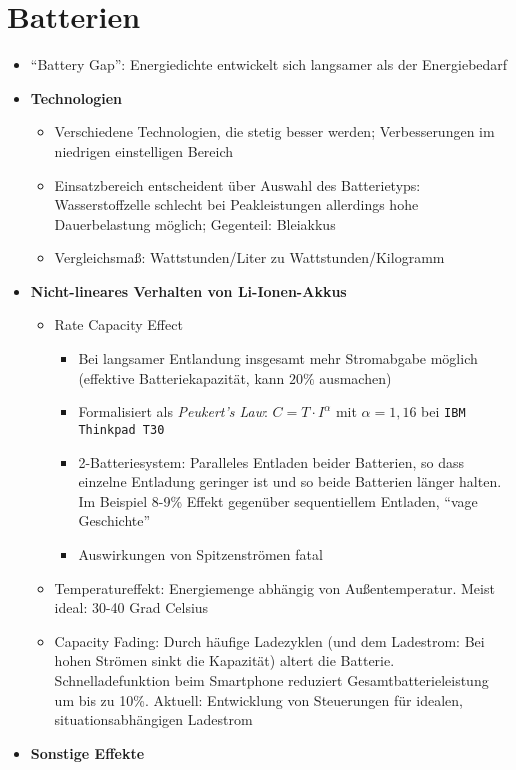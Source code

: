 \section{Batterien}
\begin{itemize}
	\item "`Battery Gap"': Energiedichte entwickelt sich langsamer als der Energiebedarf
	\item \textbf{Technologien}
	\begin{itemize}
		\item Verschiedene Technologien, die stetig besser werden; Verbesserungen im niedrigen einstelligen Bereich
		\item Einsatzbereich entscheident über Auswahl des Batterietyps: Wasserstoffzelle schlecht bei Peakleistungen allerdings hohe Dauerbelastung möglich; Gegenteil: Bleiakkus
		\item Vergleichsmaß: Wattstunden/Liter zu Wattstunden/Kilogramm
	\end{itemize}
	\item \textbf{Nicht-lineares Verhalten von Li-Ionen-Akkus}
	\begin{itemize}
		\item Rate Capacity Effect
		\begin{itemize}
			\item Bei langsamer Entlandung insgesamt mehr Stromabgabe möglich (effektive Batteriekapazität, kann \(20\%\) ausmachen)
			\item Formalisiert als \textit{Peukert's Law}: \(C=T \cdot I^\alpha\) mit \(\alpha=1,16\) bei \texttt{IBM Thinkpad T30}
			\item 2-Batteriesystem: Paralleles Entladen beider Batterien, so dass einzelne Entladung geringer ist und so beide Batterien länger halten. Im Beispiel 8-9\% Effekt gegenüber sequentiellem Entladen, "`vage Geschichte"'
			\item Auswirkungen von Spitzenströmen fatal
		\end{itemize}
		\item Temperatureffekt: Energiemenge abhängig von Außentemperatur. Meist ideal: 30-40 Grad Celsius
		\item Capacity Fading: Durch häufige Ladezyklen (und dem Ladestrom: Bei hohen Strömen sinkt die Kapazität) altert die Batterie. Schnelladefunktion beim Smartphone reduziert Gesamtbatterieleistung um bis zu 10\%. Aktuell: Entwicklung von Steuerungen für idealen, situationsabhängigen Ladestrom
	\end{itemize}
	\item \textbf{Sonstige Effekte}

\end{itemize}
